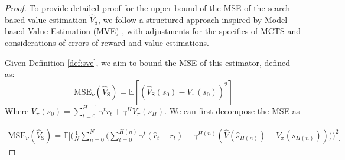 \begin{proof}
To provide detailed proof for the upper bound of the MSE of the search-based value estimation $\hat{V}_\text{S}$, we follow a structured approach inspired by Model-based Value Estimation (MVE) \citep{feinberg2018model}, with adjustments for the specifics of MCTS and considerations of errors of reward and value estimations.

Given Definition \ref{def:sve}, we aim to bound the MSE of this estimator, defined as:
\begin{equation}
    \text{MSE}_\nu(\hat{V}_\text{S})=\mathbb{E}\left[\left(\hat{V}_\text{S}(s_0)-V_\pi(s_0)\right)^2\right]
\end{equation}
Where $V_\pi(s_0)=\sum_{t=0}^{H-1}\gamma^{t}r_t+\gamma^{H}V_\pi(s_H)$. We can first decompose the MSE as

\begin{equation}
\begin{split}
\label{e1}
    \text{MSE}_\nu(\hat{V}_\text{S})=\mathbb{E}\Bigg[ \Bigg(\frac{1}{N} \sum_{n=0}^N\Bigg(\sum_{t=0}^{H(n)}\gamma^t(\hat{r}_t-r_t) +
    \gamma^{H(n)}\left(\hat{V}(\hat{s}_{H(n)})-V_\pi(s_{H(n)})\right)\Bigg)\Bigg)^2 \Bigg]
\end{split}
\end{equation}


\end{proof}
